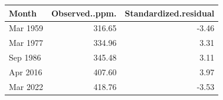 
\begin{tabular}[t]{lrr}
\toprule
Month & Observed..ppm. & Standardized.residual\\
\midrule
Mar 1959 & 316.65 & -3.46\\
Mar 1977 & 334.96 & 3.31\\
Sep 1986 & 345.48 & 3.11\\
Apr 2016 & 407.60 & 3.97\\
Mar 2022 & 418.76 & -3.53\\
\bottomrule
\end{tabular}
